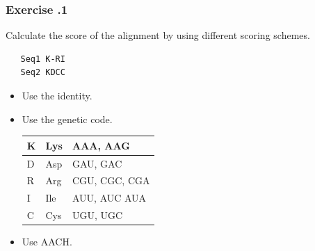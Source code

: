 %
%
\subsubsection*{Exercise \thesection.1}
Calculate the score of the alignment by using different scoring schemes.

\begin{verbatim}
   Seq1 K-RI
   Seq2 KDCC
\end{verbatim}

\begin{itemize}
\item Use the identity.
\bigskip 

\item Use the genetic code.

\begin{table}[H]
\centering
\begin{tabular}{|l|l|l|}
\hline
K & Lys & AAA, AAG      \\ \hline
D & Asp & GAU, GAC      \\ \hline
R & Arg & CGU, CGC, CGA \\ \hline
I & Ile & AUU, AUC AUA  \\ \hline
C & Cys & UGU, UGC      \\ \hline
\end{tabular}
\end{table}

\item Use AACH.
\bigskip 

\end{itemize}

\bigskip 

%
